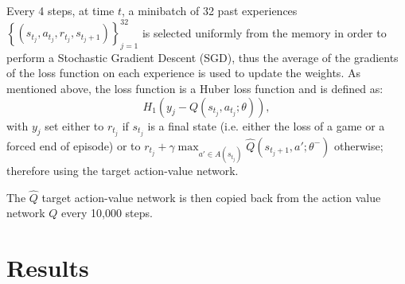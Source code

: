 \documentclass[letterpaper]{article}
\begin{document}
Every 4 steps, at time $t$, a minibatch of 32 past experiences $\left\{(s_{t_j}, a_{t_j}, r_{t_j}, s_{t_j+1})\right\}_{j=1}^{32}$ is selected uniformly from the
memory in order to perform a Stochastic Gradient Descent (SGD), thus the average of the gradients of the loss function on each experience is used to update
the weights. As mentioned above, the loss function is a Huber loss function and is defined as:
\begin{equation}
	H_1\left(y_j - Q(s_{t_j}, a_{t_j}; \theta)\right),
\end{equation}
with $y_j$ set either to $r_{t_j}$ if $s_{t_j}$ is a final state (i.e. either the loss of a game or a forced end of episode) or to
$r_{t_j} + \gamma\max_{a' \in A(s_{t_j})}\hat Q(s_{t_j+1}, a'; \theta^-)$ otherwise; therefore using the target action-value network.

The $\hat Q$ target action-value network is then copied back from the action value network $Q$ every 10,000 steps.

\section{Results}
\end{document}
